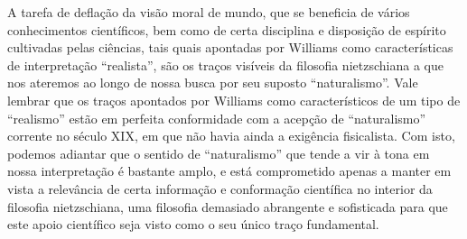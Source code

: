 \documentclass[
	12pt,				%
	openright,			%
	oneside,			%
	a4paper,			%
	english,			%
	french,				%
	spanish,			%
	brazil				%
	]{abntex2}
\begin{document}
	A tarefa de deflação da visão moral de mundo, que se beneficia de vários conhecimentos científicos, bem como de certa disciplina e disposição de espírito cultivadas pelas ciências, tais quais apontadas por Williams como características de interpretação “realista”, são os traços visíveis da filosofia nietzschiana a que nos ateremos ao longo de nossa busca por seu suposto “naturalismo”. Vale lembrar que os traços apontados por Williams como característicos de um tipo de “realismo” estão em perfeita conformidade com a acepção de “naturalismo” corrente no século XIX, em que não havia ainda a exigência fisicalista. Com isto, podemos adiantar que o sentido de “naturalismo” que tende a vir à tona em nossa interpretação é bastante amplo, e está comprometido apenas a manter em vista a relevância de certa informação e conformação científica no interior da filosofia nietzschiana, uma filosofia demasiado abrangente e sofisticada para que este apoio científico seja visto como o seu único traço fundamental. 
\end{document}
